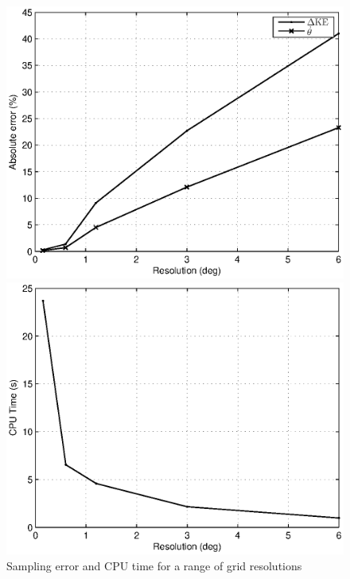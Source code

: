 \begin{figure}
	\begin{minipage}{0.49\linewidth}
		\centering
		\includegraphics[width=\linewidth]{4VirtConstLib/numacc.eps}
	\end{minipage}
	\hfill
	\begin{minipage}{0.49\linewidth}
		\centering
		\includegraphics[width=\linewidth]{4VirtConstLib/sampleCPU.eps}
	\end{minipage}
	\caption{Sampling error and CPU time for a range of grid resolutions}
\end{figure}

